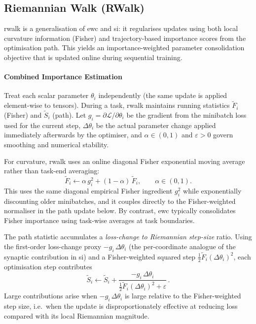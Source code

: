 \subsection{Riemannian Walk (RWalk)}
\label{sssec:rwalk_background}

\gls{rwalk} is a generalisation of \gls{ewc} and \gls{si}: it regularises updates using both local curvature information (Fisher) and trajectory-based importance scores from the optimisation path. This yields an importance-weighted parameter consolidation objective that is updated online during sequential training.

\paragraph{Combined Importance Estimation}

Treat each scalar parameter $\theta_i$ independently (the same update is applied element-wise to tensors). During a task, \gls{rwalk} maintains running statistics $\tilde F_i$ (Fisher) and $\tilde S_i$ (path). Let $g_i=\partial\mathcal{L}/\partial\theta_i$ be the gradient from the minibatch loss used for the current step, $\Delta\theta_i$ be the actual parameter change applied immediately afterwards by the optimiser, and $\alpha\in(0,1)$ and $\varepsilon>0$ govern smoothing and numerical stability.

For curvature, \gls{rwalk} uses an online diagonal Fisher exponential moving average rather than task-end averaging:
%
\begin{equation}\label{eqn:rwalk_fisher_ema}
    \tilde F_i \leftarrow \alpha\, g_i^2 + (1-\alpha)\,\tilde F_i,
    \qquad
    \alpha\in(0,1).
\end{equation}
%
This uses the same diagonal empirical Fisher ingredient $g_i^2$ while exponentially discounting older minibatches, and it couples directly to the Fisher-weighted normaliser in the path update below. By contrast, \gls{ewc} typically consolidates Fisher importance using task-wise averages at task boundaries.

The path statistic accumulates a \emph{loss-change to Riemannian step-size} ratio. Using the first-order loss-change proxy $-g_i\,\Delta\theta_i$ (the per-coordinate analogue of the synaptic contribution in \gls{si}) and a Fisher-weighted squared step $\tfrac{1}{2}\tilde F_i(\Delta\theta_i)^2$, each optimisation step contributes
%
\begin{equation}\label{eqn:rwalk_path_update}
    \tilde S_i \leftarrow
    \tilde S_i +
    \frac{-g_i\,\Delta\theta_i}{\tfrac{1}{2}\tilde F_i(\Delta\theta_i)^2+\varepsilon}
    \, .
\end{equation}
%
Large contributions arise when $-g_i\,\Delta\theta_i$ is large relative to the Fisher-weighted step size, i.e.\ when the update is disproportionately effective at reducing loss compared with its local Riemannian magnitude.

